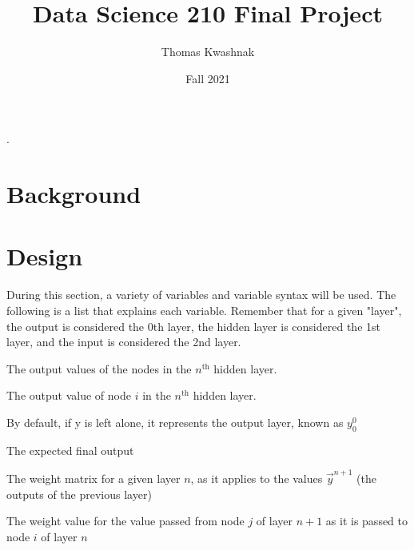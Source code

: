 \documentclass[10pt]{article}
\title{Data Science 210 Final Project}
\author{Thomas Kwashnak}
\date{Fall 2021}
\begin{document}
\maketitle
\setlength{\parindent}{0pt}.
\setlength{\parskip}{\baselineskip}
\lstset{numbers=left, numberstyle=\footnotesize, frame=l} 


\section{Background}
\section{Design}
During this section, a variety of variables and variable syntax will be used. The following is a list that explains each variable. Remember that for a given "layer", the output is considered the 0th layer, the hidden layer is considered the 1st layer, and the input is considered the 2nd layer.
\begin{description}[style=nextline]
    \item[$\vec{y}^n$] The output values of the nodes in the $n^{\text{th}}$ hidden layer. 
    \item[$y^n_i$] The output value of node $i$ in the $n^{\text{th}}$ hidden layer.
    \item[$y$] By default, if y is left alone, it represents the output layer, known as $y^0_0$ 
    \item[$\hat{y}$] The expected final output 
    \item[$W^n$] The weight matrix for a given layer $n$, as it applies to the values $\vec{y}^{n+1}$ (the outputs of the previous layer) 
    \item[$w^n_{i,j}$] The weight value for the value passed from node $j$ of layer $n+1$ as it is passed to node $i$ of layer $n$
\end{description}
\end{document}
